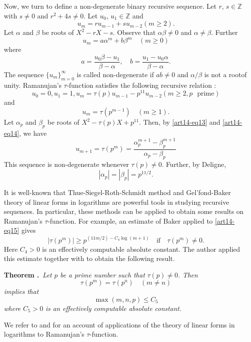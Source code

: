 Now, we turn to define a non-degenerate binary recursive sequence. Let $r$, $s\in \mathbb{Z}$ with $s\neq 0$ and $r^{2}+4s\neq 0$. Let $u_{0}$, $u_{1}\in \mathbb{Z}$ and
$$
u_{m}=ru_{m-1}+su_{m-2}(m\geq 2).
$$
Let $\alpha$ and $\beta$ be roots of $X^{2}-rX-s$. Observe that $\alpha\beta\neq 0$ and $\alpha\neq \beta$. Further
\begin{equation}
u_{m}=a\alpha^{m}+b\beta^{m}\quad (m\geq 0)\label{art14-eq13}
\end{equation}
where
\begin{equation}
a=\frac{u_{0}\beta-u_{1}}{\beta-\alpha},\quad b=\frac{u_{1}-u_{0}\alpha}{\beta-\alpha}.\label{art14-eq14}
\end{equation}
The sequence $\{u_{m}\}^{\infty}_{m=0}$ is called non-degenerate if $ab\neq 0$ and $\alpha/\beta$ is not a root\pageoriginale of unity. Ramanujan's $\tau$-function satisfies the following recursive relation :
$$
u_{0}=0, u_{1}=1, u_{m}=\tau(p)u_{m-1}-p^{11}u_{m-2}(m\geq 2, p\text{~ prime})
$$
and
$$
u_{m}=\tau(p^{m-1})\quad (m\geq 1).
$$
Let $\alpha_{p}$ and $\beta_{p}$ be roots of $X^{2}-\tau(p)X+p^{11}$. Then, by \eqref{art14-eq13} and \eqref{art14-eq14}, we have
\begin{equation}
u_{m+1}=\tau(p^{m})=\frac{\alpha^{m+1}_{p}-\beta^{m+1}_{p}}{\alpha_{p}-\beta_{p}}\label{art14-eq15}
\end{equation}
This sequence is non-degenerate whenever $\tau(p)\neq 0$. Further, by Deligne,
$$
|\alpha_{p}|=|\beta_{p}|=p^{11/2}.
$$

It is well-known that Thue-Siegel-Roth-Schmidt method and Gel'fond-Baker theory of linear forms in logarithms are powerful tools in studying recursive sequences. In particular, these methods can be applied to obtain some results on Ramanujan's $\tau$-function. For example, an estimate of Baker \cite{art14-key3} applied to \eqref{art14-eq15} gives
$$
|\tau(p^{m})|\geq p^{(11m/2)-C_{4}\log (m+1)}\quad\text{if}\quad \tau(p^{m})\neq 0.
$$
Here $C_{4}>0$ is an effectively computable absolute constant. The author \cite{art14-key28} applied this estimate together with \cite[Corollary 7.1]{art14-key33} to obtain the following result.

\medskip
\noindent
{\bf Theorem .\label{art14-thm3}}~{\em Let $p$ be a prime number such that $\tau(p)\neq 0$. Then}
$$
\tau(p^{m})=\tau(p^{n})\quad (m\neq n)
$$
{\em implies that}
$$
\max (m,n,p)\leq C_{5}
$$
{\em where $C_{5}>0$ is an effectively computable absolute constant.}

We refer to \cite{art14-key16} and \cite{art14-key28} for an account of applications of the theory of linear forms in logarithms to Ramanujan's $\tau$-function.

